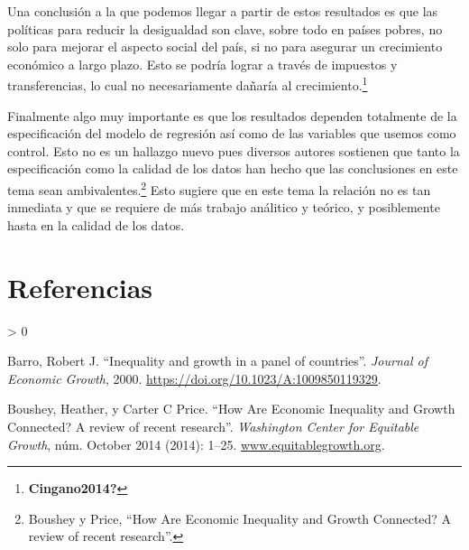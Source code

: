 \documentclass[
  11pt,
]{article}
\newlength{\cslhangindent}
\newenvironment{CSLReferences}[2] %
 {%
  \setlength{\parindent}{0pt}
  \ifodd #1 \everypar{\setlength{\hangindent}{\cslhangindent}}\ignorespaces\fi
  \ifnum #2 > 0
  \setlength{\parskip}{#2\baselineskip}
  \fi
 }%
 {}
\begin{document}
Una conclusión a la que podemos llegar a partir de estos resultados es
que las políticas para reducir la desigualdad son clave, sobre todo en
países pobres, no solo para mejorar el aspecto social del país, si no
para asegurar un crecimiento económico a largo plazo. Esto se podría
lograr a través de impuestos y transferencias, lo cual no necesariamente
dañaría al crecimiento.\footnote{\textbf{Cingano2014?}}

Finalmente algo muy importante es que los resultados dependen totalmente
de la especificación del modelo de regresión así como de las variables
que usemos como control. Esto no es un hallazgo nuevo pues diversos
autores sostienen que tanto la especificación como la calidad de los
datos han hecho que las conclusiones en este tema sean
ambivalentes.\footnote{Boushey y Price, {``{How Are Economic Inequality
  and Growth Connected? A review of recent research}''}.} Esto sugiere
que en este tema la relación no es tan inmediata y que se requiere de
más trabajo análitico y teórico, y posiblemente hasta en la calidad de
los datos.

\newpage

\hypertarget{referencias}{%
\section*{Referencias}\label{referencias}}

\hypertarget{refs}{}
\begin{CSLReferences}{1}{0}
\leavevmode\hypertarget{ref-Barro2000}{}%
Barro, Robert J. {``{Inequality and growth in a panel of countries}''}.
\emph{Journal of Economic Growth}, 2000.
\url{https://doi.org/10.1023/A:1009850119329}.

\leavevmode\hypertarget{ref-Boushey2014}{}%
Boushey, Heather, y Carter C Price. {``{How Are Economic Inequality and
Growth Connected? A review of recent research}''}. \emph{Washington
Center for Equitable Growth}, núm. October 2014 (2014): 1--25.
\href{https://www.equitablegrowth.org}{www.equitablegrowth.org}.

\end{CSLReferences}
\end{document}

